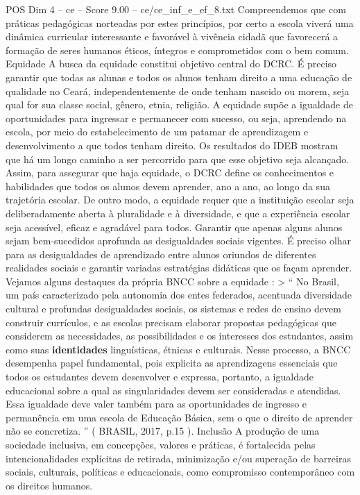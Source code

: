 \begin{textsample}{POS Dim 4 – ce – Score 9.00 – ce/ce\_inf\_e\_ef\_8.txt}
Compreendemos que com práticas pedagógicas norteadas por estes princípios, por certo a escola viverá uma dinâmica curricular interessante e favorável à vivência cidadã que favorecerá a formação de seres humanos éticos, íntegros e comprometidos com o bem comum.
Equidade A busca da equidade constitui objetivo central do DCRC.
É preciso garantir que todas as alunas e todos os alunos tenham direito a uma educação de qualidade no Ceará, independentemente de onde tenham nascido ou morem, seja qual for sua classe social, gênero, etnia, religião.
A equidade supõe a igualdade de oportunidades para ingressar e permanecer com sucesso, ou seja, aprendendo na escola, por meio do estabelecimento de um patamar de aprendizagem e desenvolvimento a que todos tenham direito.
Os resultados do IDEB mostram que há um longo caminho a ser percorrido para que esse objetivo seja alcançado.
Assim, para assegurar que haja equidade, o DCRC define os conhecimentos e habilidades que todos os alunos devem aprender, ano a ano, ao longo da sua trajetória escolar.
De outro modo, a equidade requer que a instituição escolar seja deliberadamente aberta à pluralidade e à diversidade, e que a experiência escolar seja acessível, eficaz e agradável para todos.
Garantir que apenas alguns alunos sejam bem-sucedidos aprofunda as desigualdades sociais vigentes.
É preciso olhar para as desigualdades de aprendizado entre alunos oriundos de diferentes realidades sociais e garantir variadas estratégias didáticas que os façam aprender.
Vejamos alguns destaques da própria BNCC sobre a equidade : > “ No Brasil, um país caracterizado pela autonomia dos entes federados, acentuada diversidade cultural e profundas desigualdades sociais, os sistemas e redes de ensino devem construir currículos, e as escolas precisam elaborar propostas pedagógicas que considerem as necessidades, as possibilidades e os interesses dos estudantes, assim como suas \textbf{identidades} linguísticas, étnicas e culturais.
Nesse processo, a BNCC desempenha papel fundamental, pois explicita as aprendizagens essenciais que todos os estudantes devem desenvolver e expressa, portanto, a igualdade educacional sobre a qual as singularidades devem ser consideradas e atendidas.
Essa igualdade deve valer também para as oportunidades de ingresso e permanência em uma escola de Educação Básica, sem o que o direito de aprender não se concretiza. ” ( BRASIL, 2017, p.15 ).
Inclusão A produção de uma sociedade inclusiva, em concepções, valores e práticas, é fortalecida pelas intencionalidades explícitas de retirada, minimização e/ou superação de barreiras sociais, culturais, políticas e educacionais, como compromisso contemporâneo com os direitos humanos.

\end{textsample}
